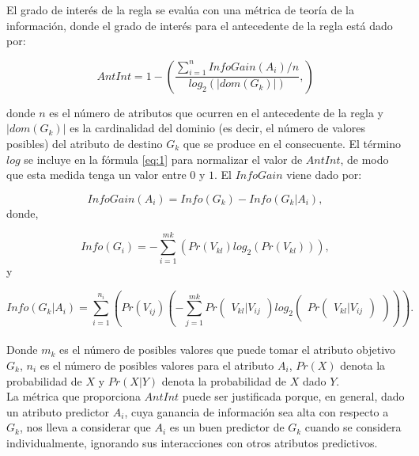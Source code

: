 El grado de interés de la regla se evalúa con una métrica de teoría de la información, donde el grado de interés para el antecedente de la regla está dado por:

\begin{equation} 
\label{eq:1}
AntInt = 1- \left( \frac{\sum\limits_{i=1}^n InfoGain(A_i)/n}
{log_2(\left| dom(G_k) \right|)},
\right)
\end{equation}

\noindent
donde $n$ es el número de atributos que ocurren en el antecedente de la regla y $|dom(G_k)|$ es la cardinalidad del dominio (es decir, el número de valores posibles) del atributo de destino $G_k$ que se produce en el consecuente. El término $log$ se incluye en la fórmula \ref{eq:1} para normalizar el valor de $AntInt$, de modo que esta medida tenga un valor entre $0$ y $1$. El $InfoGain$ viene dado por:

\begin{equation} \label{eq:2}
InfoGain(A_i)=Info(G_k)-Info(\left.G_k\right| A_i),
\end{equation}
donde,

\begin{equation}  \label{eq:3}
Info(G_i)=-\sum\limits_{i=1}^{mk}\left(Pr(V_{kl}) log_2 (Pr(V_{kl}))\right),
\end{equation}
y

\begin{equation} \label{eq:4}
Info(\left. G_k \right| A_i)=\sum\limits_{i=1}^{n_i}\left( Pr(V_{ij})\left(-\sum\limits_{j=1}^{mk} Pr\begin{pmatrix}V_{kl}|V_{ij}\end{pmatrix} log_2 \begin{pmatrix}Pr\begin{pmatrix}V_{kl}|V_{ij}\end{pmatrix}\end{pmatrix}\right)  \right).
\end{equation}
\\
Donde $m_k$ es el número de posibles valores que puede tomar el atributo objetivo $G_k$, $n_i$ es el número de posibles valores para el atributo $A_i$, $Pr(X)$ denota la probabilidad de $X$ y $Pr(X|Y)$ denota la probabilidad de $X$ dado $Y$.
\\
La métrica que proporciona $AntInt$ puede ser justificada porque, en general, dado un atributo predictor $A_i$, cuya ganancia de información sea alta con respecto a $G_k$, nos lleva a considerar que $A_i$ es un buen predictor de $G_k$ cuando se considera individualmente, ignorando sus interacciones con otros atributos predictivos.

